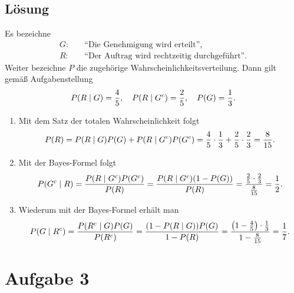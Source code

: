 \documentclass{exercise}
\begin{document}
    \subsection*{Lösung}
    Es bezeichne
    \begin{align*}
        G: \quad &\text{``Die Genehmigung wird erteilt''},\\
        R: \quad &\text{``Der Auftrag wird rechtzeitig durchgeführt''}.
    \end{align*}
    Weiter bezeichne \(P\) die zugehörige Wahrscheinlichkeitsverteilung.
    Dann gilt gemäß Aufgabenstellung
    \[
        P\parentheses*{R \mid G} = \frac{4}{5}, \quad P\parentheses*{R \mid G^c} = \frac{2}{5}, \quad P\parentheses*{G} = \frac{1}{3}.
    \]
    \begin{enumerate}
        \item Mit dem Satz der totalen Wahrscheinlichkeit folgt
        \[
            P\parentheses*{R} = P\parentheses*{R \mid G}P\parentheses*{G} + P\parentheses*{R \mid G^c}P\parentheses*{G^c} = \frac{4}{5} \cdot \frac{1}{3} + \frac{2}{5} \cdot \frac{2}{3} = \frac{8}{15}.
        \]
        \item Mit der Bayes-Formel folgt
        \[
            P\parentheses*{G^c \mid R} = \frac{P\parentheses*{R \mid G^c}P\parentheses*{G^c}}{P\parentheses*{R}} = \frac{P\parentheses*{R \mid G^c}\parentheses*{1 - P\parentheses*{G}}}{P\parentheses*{R}} = \frac{\frac{2}{5} \cdot \frac{2}{3}}{\frac{8}{15}} = \frac{1}{2}.
        \]
        \item Wiederum mit der Bayes-Formel erhält man
        \[
            P\parentheses*{G \mid R^c} = \frac{P\parentheses*{R^c \mid G}P\parentheses*{G}}{P\parentheses*{R^c}} = \frac{\parentheses*{1 - P\parentheses*{R \mid G}}P\parentheses*{G}}{1 - P\parentheses*{R}} = \frac{\parentheses*{1 - \frac{4}{5}} \cdot \frac{1}{3}}{1 - \frac{8}{15}} = \frac{1}{7}.
        \]
    \end{enumerate}


    \section*{Aufgabe 3}
\end{document}
